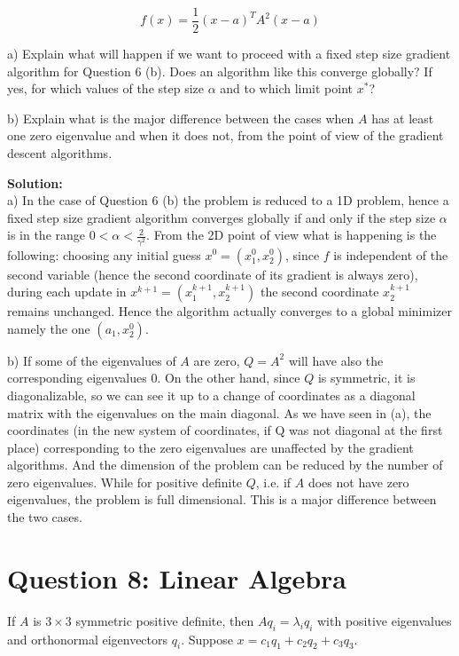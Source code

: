 \documentclass[12pt]{article}
\begin{document}
	\begin{equation}
		f(x) = \frac{1}{2}(x-a)^TA^2(x-a)
	\end{equation}
	
	a) Explain what will happen if we want to proceed with a fixed step size gradient algorithm for Question 6 (b). Does an algorithm like this converge globally? If yes, for which values of the step size $\alpha$ and to which limit point $x^*$?
	
	b) Explain what is the major difference between the cases when $A$ has at least one zero eigenvalue and when it does not, from the point of view of the gradient descent algorithms.
	
	\begin{framed}
		\textbf{Solution:}\\
		a) In the case of Question 6 (b) the problem is reduced to a 1D problem, hence a fixed step size gradient algorithm converges globally if and only if the step size $\alpha$ is in the range $0 < \alpha < \frac{2}{\gamma^2}$. From the 2D point of view what is happening is the following: choosing any initial guess $x^0 = (x^0_1, x^0_2)$, since $f$ is independent of the second variable (hence the second coordinate of its gradient is always zero), during each update in $x^{k+1} = (x^{k+1}_1,x^{k+1}_2)$ the second coordinate $x_2^{k+1}$ remains unchanged. Hence the algorithm actually converges to a global minimizer namely the one $(a_1,x_2^0)$.
		
		b) If some of the eigenvalues of $A$ are zero, $Q = A^2$ will have also the corresponding eigenvalues 0. On the other hand, since $Q$ is symmetric, it is diagonalizable, so we can see it up to a change of coordinates as a diagonal matrix with the eigenvalues on the main diagonal. As we have seen in (a), the coordinates (in the new system of coordinates, if Q was not diagonal at the first place) corresponding to the zero eigenvalues are unaffected by the gradient algorithms. And the dimension of the problem can be reduced by the number of zero eigenvalues. While for positive definite $Q$, i.e. if $A$ does not have zero eigenvalues, the problem is full dimensional. This is a major difference between the two cases.
	\end{framed}
	
	\section*{Question 8: Linear Algebra \cite{q1}}
	If $A$ is $3 \times 3$ symmetric positive definite, then $Aq_i = \lambda_i q_i$ with positive eigenvalues and orthonormal eigenvectors $q_i$. Suppose $x = c_1q_1 + c_2q_2 + c_3q_3$.
	
\end{document}
